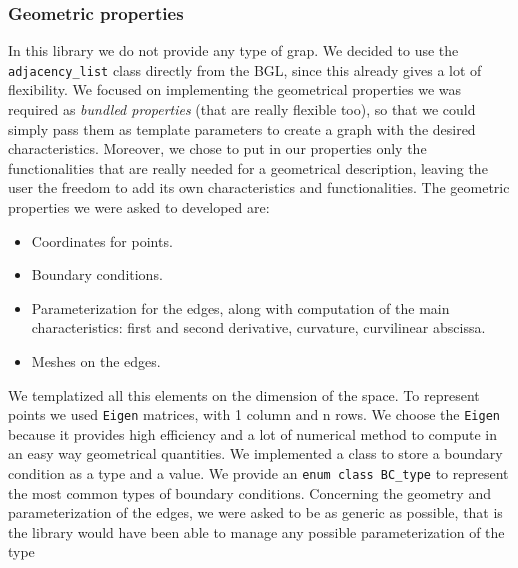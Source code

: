 \documentclass[11pt]{article} %
\newcommand{\classname}[1]{\texttt{#1}}
\begin{document}
	
		\subsubsection{Geometric properties}
		In this library we do not provide any type of grap. We decided to use the \classname{adjacency\_list} class directly from the BGL, since this already gives a lot of flexibility. We focused on implementing the geometrical properties we was required as \textit{bundled properties} (that are really flexible too), so that we could simply pass them as template parameters to create a graph with the desired characteristics. Moreover, we chose to put in our properties only the functionalities that are really needed for a geometrical description, leaving the user the freedom to add its own characteristics and functionalities. \newline
		The geometric properties we were asked to developed are:
		\begin{itemize}
			\item Coordinates for points.
			\item Boundary conditions.
			\item Parameterization for the edges, along with computation of the main characteristics: first and second derivative, curvature, curvilinear abscissa.
			\item Meshes on the edges.
		\end{itemize}
		We templatized all this elements on the dimension of the space.
		\newline\newline
		To represent points we used \texttt{Eigen} matrices, with 1 column and n rows. We choose the \texttt{Eigen} because it provides high efficiency and a lot of numerical method to compute in an easy way geometrical quantities.
		\newline\newline
		We implemented a class to store a boundary condition as a type and a value. We provide an \texttt{enum class BC\_type} to represent the most common types of boundary conditions.
		\newline\newline
		Concerning the geometry and parameterization of the edges, we were asked to be as generic as possible, that is the library would have been able to manage any possible parameterization of the type
\end{document}
